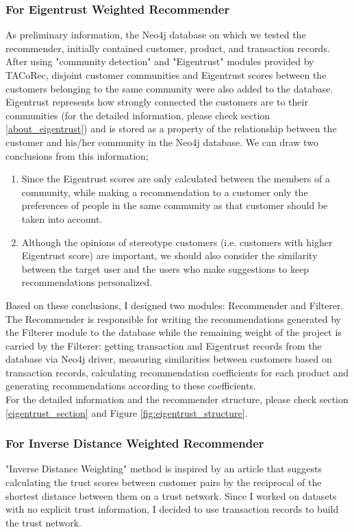 \subsubsection{For Eigentrust Weighted Recommender}
As preliminary information, the Neo4j database on which we tested the recommender, initially contained customer, product, and transaction records. After using "community detection" and "Eigentrust" modules provided by TACoRec, disjoint customer communities and Eigentrust scores between the customers belonging to the same community were also added to the database.\\

Eigentrust represents how strongly connected the customers are to their communities (for the detailed information, please check section \ref{about_eigentrust}) and is stored as a property of the relationship between the customer and his/her community in the Neo4j database. We can draw two conclusions from this information;
\begin{enumerate}
	\item Since the Eigentrust scores are only calculated between the members of a community, while making a recommendation to a customer only the preferences of people in the same community as that customer should be taken into account.
	\item Although the opinions of stereotype customers (i.e. customers with higher Eigentrust score) are important, we should also consider the similarity between the target user and the users who make suggestions to keep recommendations personalized.
\end{enumerate}
Based on these conclusions, I designed two modules: Recommender and Filterer. The Recommender is responsible for writing the recommendations generated by the Filterer module to the database while the remaining weight of the project is carried by the Filterer: getting transaction and Eigentrust records from the database via Neo4j driver, measuring similarities between customers based on transaction records, calculating recommendation coefficients for each product and generating recommendations according to these coefficients. \\

For the detailed information and the recommender structure, please check section \ref{eigentrust_section} and Figure \ref{fig:eigentrust_structure}.
\subsubsection{For Inverse Distance Weighted Recommender}
"Inverse Distance Weighting" method is inspired by an article\cite{inverse_article} that suggests calculating the trust scores between customer pairs by the reciprocal of the shortest distance between them on a trust network. Since I worked on datasets with no explicit trust information, I decided to use transaction records to build the trust network. \\

